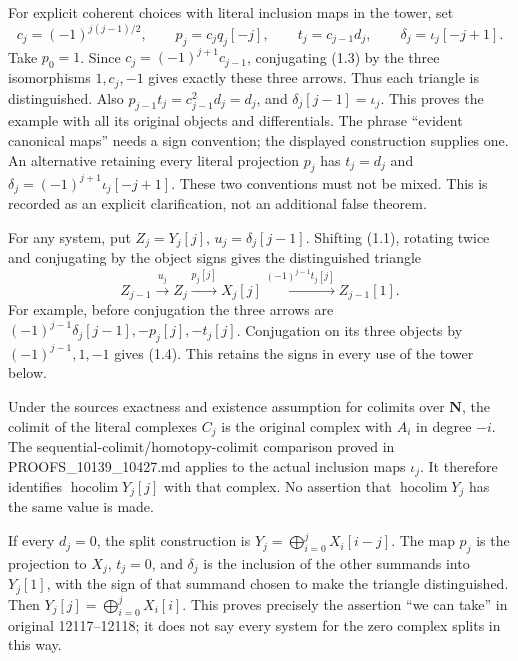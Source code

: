 \documentclass[11pt]{article}
\begin{document}
For explicit coherent choices with literal inclusion maps in the tower,\allowbreak{} set \[
c_j=(-1)^{j(j-1)/2},\qquad
p_j=c_j q_j[-j],\qquad t_j=c_{j-1}d_j,\qquad
\delta_j=\iota_j[-j+1].
\] Take \(p_0=1\). Since \(c_j=(-1)^{j+1}c_{j-1}\),\allowbreak{} conjugating (1.3)\allowbreak{} by the three isomorphisms \(1,c_j,-1\) gives exactly these three arrows. Thus each triangle is distinguished. Also \(p_{j-1}t_j=c_{j-1}^2d_j=d_j\),\allowbreak{} and \(\delta_j[j-1]=\iota_j\). This proves the example with all its original objects and differentials. The phrase ``evident canonical maps'' needs a sign convention; the displayed construction supplies one. An alternative retaining every literal projection \(p_j\) has \(t_j=d_j\) and \(\delta_j=(-1)^{j+1}\iota_j[-j+1]\). These two conventions must not be mixed. This is recorded as an explicit clarification,\allowbreak{} not an additional false theorem.

For any system,\allowbreak{} put \(Z_j=Y_j[j]\),\allowbreak{} \(u_j=\delta_j[j-1]\). Shifting (1.1)\allowbreak{},\allowbreak{} rotating twice and conjugating by the object signs gives the distinguished triangle \[
Z_{j-1}\xrightarrow{u_j}Z_j\xrightarrow{p_j[j]}X_j[j]
 \xrightarrow{(-1)^{j-1}t_j[j]}Z_{j-1}[1]. \tag{1.4}
\] For example,\allowbreak{} before conjugation the three arrows are \((-1)^{j-1}\delta_j[j-1],-p_j[j],-t_j[j]\). Conjugation on its three objects by \((-1)^{j-1},1,-1\) gives (1.4)\allowbreak{}. This retains the signs in every use of the tower below.

Under the source\textquotesingle s exactness and existence assumption for colimits over \(\mathbf N\),\allowbreak{} the colimit of the literal complexes \(C_j\) is the original complex with \(A_i\) in degree \(-i\). The sequential-colimit/\allowbreak{}homotopy-colimit comparison proved in PROOFS\_\allowbreak{}10139\_\allowbreak{}10427.md applies to the actual inclusion maps \(\iota_j\). It therefore identifies \(\operatorname{hocolim}Y_j[j]\) with that complex. No assertion that \(\operatorname{hocolim}Y_j\) has the same value is made.

If every \(d_j=0\),\allowbreak{} the split construction is \(Y_j=\bigoplus_{i=0}^jX_i[i-j]\). The map \(p_j\) is the projection to \(X_j\),\allowbreak{} \(t_j=0\),\allowbreak{} and \(\delta_j\) is the inclusion of the other summands into \(Y_j[1]\),\allowbreak{} with the sign of that summand chosen to make the triangle distinguished. Then \(Y_j[j]=\bigoplus_{i=0}^jX_i[i]\). This proves precisely the assertion ``we can take'' in original 12117–\allowbreak{}12118; it does not say every system for the zero complex splits in this way.
\end{document}
